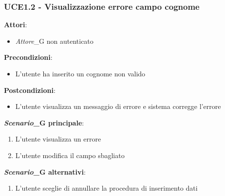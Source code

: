 \subsubsection{UCE1.2 - Visualizzazione errore campo cognome}
\textbf{Attori}:
\begin{itemize}
    \item \textit{Attore}_G non autenticato
\end{itemize}
\textbf{Precondizioni}:
\begin{itemize}
    \item L'utente ha inserito un cognome non valido
\end{itemize}
\textbf{Postcondizioni}:
\begin{itemize}
    \item L'utente visualizza un messaggio di errore e sistema corregge l'errore
\end{itemize}
\textbf{\textit{Scenario}_G principale}:
\begin{enumerate}
    \item L'utente visualizza un errore 
    \item L'utente modifica il campo sbagliato
\end{enumerate}
\textbf{\textit{Scenario}_G alternativi}:
\begin{enumerate}
    \item L'utente sceglie di annullare la procedura di inserimento dati
\end{enumerate}